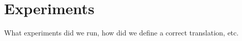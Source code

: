 \section{Experiments}
\label{sec:experiments}
What experiments did we run, how did we define a correct translation, etc.